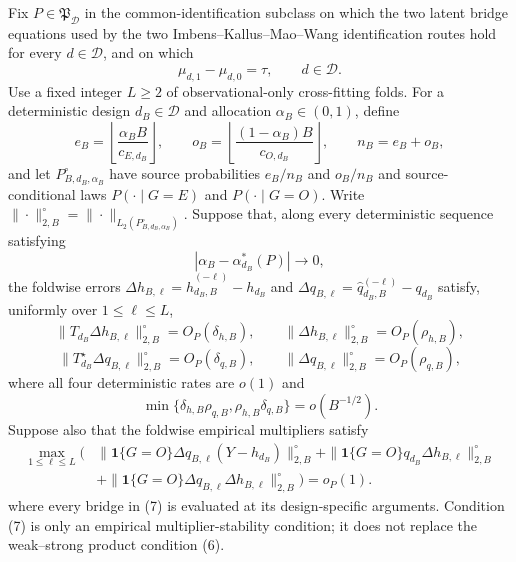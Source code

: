 Fix \(P\in\mathfrak P_{\mathcal D}\) in the common-identification subclass on which the two latent bridge equations used by the two Imbens--Kallus--Mao--Wang identification routes hold for every \(d\in\mathcal D\), and on which
\[
 \mu_{d,1}-\mu_{d,0}=\tau,\qquad d\in\mathcal D.             \tag{1}
\]
Use a fixed integer \(L\ge2\) of observational-only cross-fitting folds.  For a deterministic design \(d_B\in\mathcal D\) and allocation \(\alpha_B\in(0,1)\), define
\[
 e_B=\left\lfloor\frac{\alpha_BB}{c_{E,d_B}}\right\rfloor,
 \qquad
 o_B=\left\lfloor\frac{(1-\alpha_B)B}{c_{O,d_B}}\right\rfloor,
 \qquad n_B=e_B+o_B,                                        \tag{2}
\]
and let \(P_{B,d_B,\alpha_B}^{\circ}\) have source probabilities \(e_B/n_B\) and \(o_B/n_B\) and source-conditional laws \(P(\cdot\mid G=E)\) and \(P(\cdot\mid G=O)\).  Write \(\|\cdot\|_{2,B}^{\circ}=\|\cdot\|_{L_2(P_{B,d_B,\alpha_B}^{\circ})}\).  Suppose that, along every deterministic sequence satisfying
\[
 |\alpha_B-\alpha_{d_B}^*(P)|\longrightarrow0,               \tag{3}
\]
the foldwise errors \(\Delta h_{B,\ell}=\widehat h_{d_B,B}^{(-\ell)}-h_{d_B}\) and \(\Delta q_{B,\ell}=\widehat q_{d_B,B}^{(-\ell)}-q_{d_B}\) satisfy, uniformly over \(1\le\ell\le L\),
\[
 \|T_{d_B}\Delta h_{B,\ell}\|_{2,B}^{\circ}=O_P(\delta_{h,B}),
 \qquad
 \|\Delta h_{B,\ell}\|_{2,B}^{\circ}=O_P(\rho_{h,B}),       \tag{4}
\]
\[
 \|T_{d_B}^{\star}\Delta q_{B,\ell}\|_{2,B}^{\circ}=O_P(\delta_{q,B}),
 \qquad
 \|\Delta q_{B,\ell}\|_{2,B}^{\circ}=O_P(\rho_{q,B}),       \tag{5}
\]
where all four deterministic rates are \(o(1)\) and
\[
 \min\{\delta_{h,B}\rho_{q,B},\rho_{h,B}\delta_{q,B}\}
 =o(B^{-1/2}).                                                \tag{6}
\]
Suppose also that the foldwise empirical multipliers satisfy
\[
\begin{aligned}
 \max_{1\le\ell\le L}\bigl(&
 \|\mathbf 1\{G=O\}\Delta q_{B,\ell}(Y-h_{d_B})\|_{2,B}^{\circ}
 +\|\mathbf 1\{G=O\}q_{d_B}\Delta h_{B,\ell}\|_{2,B}^{\circ}\\
 &+\|\mathbf 1\{G=O\}\Delta q_{B,\ell}\Delta h_{B,\ell}\|_{2,B}^{\circ}
 \bigr)=o_P(1).
\end{aligned}                                               \tag{7}
\]
where every bridge in (7) is evaluated at its design-specific arguments.  Condition (7) is only an empirical multiplier-stability condition; it does not replace the weak--strong product condition (6).

